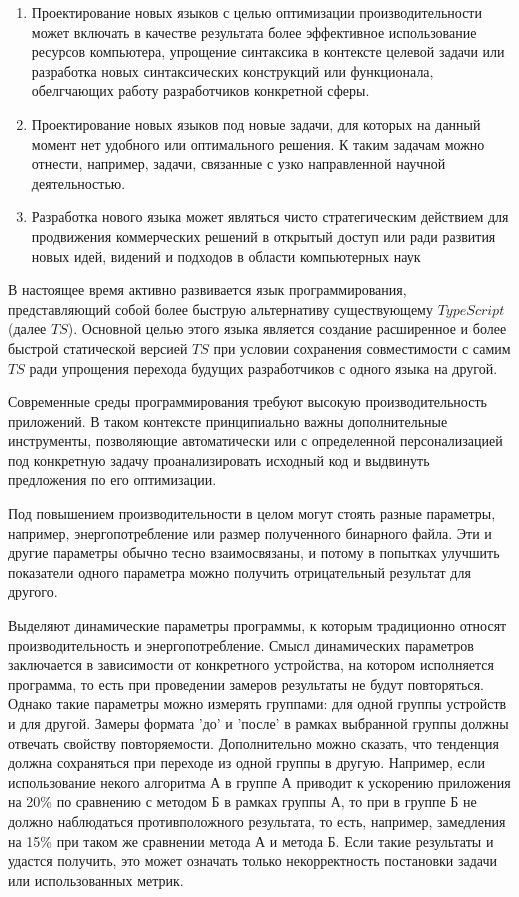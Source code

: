\documentclass{mipt-thesis-bs}
\begin{document}
\begin{enumerate}
    \item Проектирование новых языков с целью оптимизации производительности
    может включать в качестве результата более эффективное использование
    ресурсов компьютера, упрощение синтаксика в контексте целевой задачи
    или разработка новых синтаксических конструкций или функционала,
    обелгчающих работу разработчиков конкретной сферы.
    \item  Проектирование новых языков под новые задачи, для которых на данный
    момент нет удобного или оптимального решения. К таким задачам можно отнести,
    например, задачи, связанные с узко направленной научной деятельностью.
    \item Разработка нового языка может являться чисто стратегическим действием
    для продвижения коммерческих решений в открытый доступ или ради развития
    новых идей, видений и подходов в области компьютерных наук
\end{enumerate}

В настоящее время активно развивается язык программирования, представляющий собой
более быструю альтернативу существующему $TypeScript$ (далее $TS$). Основной целью этого языка
является создание расширенное и более быстрой статической версией $TS$ при
условии сохранения совместимости с самим $TS$ ради упрощения перехода будущих разработчиков
с одного языка на другой.

Современные среды программирования требуют высокую производительность приложений. В таком
контексте принципиально важны дополнительные инструменты, позволяющие автоматически или с
определенной персонализацией под конкретную задачу проанализировать исходный код и выдвинуть
предложения по его оптимизации.

Под повышением производительности в целом могут стоять разные параметры, например,
энергопотребление или размер полученного бинарного файла. Эти и другие параметры обычно
тесно взаимосвязаны, и потому в попытках улучшить показатели одного параметра можно получить
отрицательный результат для другого.

Выделяют динамические параметры программы, к которым традиционно относят производительность
и энергопотребление. Смысл динамических параметров заключается в зависимости от конкретного устройства,
на котором исполняется программа, то есть при проведении замеров результаты не будут повторяться.
Однако такие параметры можно измерять группами: для одной группы устройств и для другой.
Замеры формата 'до' и 'после' в рамках выбранной группы должны отвечать свойству повторяемости.
Дополнительно можно сказать, что тенденция должна сохраняться при переходе из одной группы в другую.
Например, если использование некого алгоритма А в группе А приводит к ускорению приложения на 20\% по
сравнению с методом Б в рамках группы А, то при в группе Б не должно наблюдаться противположного результата,
то есть, например, замедления на 15\% при таком же сравнении метода А и метода Б. Если такие результаты и
удастся получить, это может означать только некорректность постановки задачи или использованных метрик.
\end{document}

